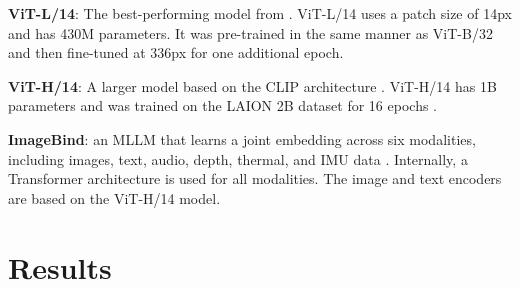 \documentclass[10pt, a4paper]{article}
\begin{document}
\textbf{ViT-L/14}: The best-performing model from \citep[described in the paper as ViT-L/14@336px]{radfordLearningTransferableVisual2021a}. ViT-L/14 uses a patch size of 14px and has 430M parameters. It was pre-trained in the same manner as ViT-B/32 and then fine-tuned at 336px for one additional epoch.

\textbf{ViT-H/14}: A larger model based on the CLIP architecture \citep{ilharco_gabriel_2021_5143773}. ViT-H/14 has 1B parameters and was trained on the LAION 2B dataset for 16 epochs \cite{schuhmannLaion5bOpenLargescale2022}.

\textbf{ImageBind}: an MLLM that learns a joint embedding across six modalities, including images, text, audio, depth, thermal, and IMU data \cite{girdhar2023imagebind}. Internally, a Transformer architecture is used for all modalities. The image and text encoders are based on the ViT-H/14 model.


\section{Results}
\end{document}
